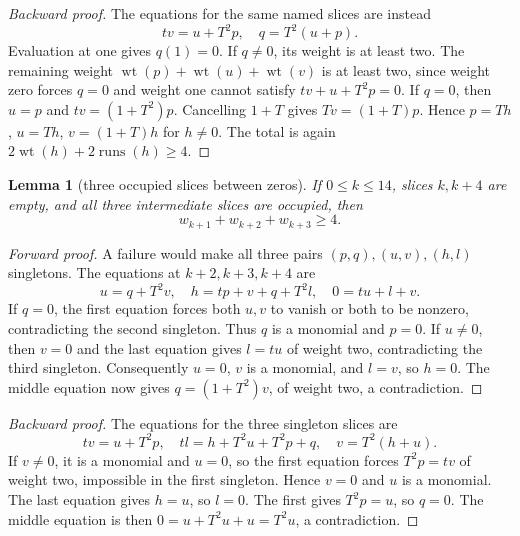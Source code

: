 \documentclass{article}
\newtheorem{lemma}{Lemma}
\DeclareMathOperator{\wt}{wt}
\DeclareMathOperator{\runs}{runs}
\begin{document}
\begin{proof}[Backward proof]
  The equations for the same named slices are instead
  \begin{equation}
    tv = u + T^2 p, \quad q = T^2 (u + p).
  \end{equation}
  Evaluation at one gives \(q(1) = 0\). If \(q \ne 0\), its weight is at least two.
  The remaining weight \(\wt(p) + \wt(u) + \wt(v)\) is at least two, since weight
  zero forces \(q = 0\) and weight one cannot satisfy \(tv + u + T^2 p = 0\).
  If \(q = 0\), then \(u = p\) and \(tv = (1 + T^2) p\). Cancelling \(1 + T\) gives
  \(Tv = (1 + T) p\). Hence \(p = Th\), \(u = Th\), \(v = (1 + T) h\) for \(h \ne 0\).
  The total is again \(2 \wt(h) + 2 \runs(h) \ge 4\).
\end{proof}

\begin{lemma}[three occupied slices between zeros]\label{lem:gap-four}
  If \(0 \le k \le 14\), slices
  \(k, k + 4\) are empty, and all three intermediate slices are occupied, then
  \begin{equation}
    w_{k+1} + w_{k+2} + w_{k+3} \ge 4.
  \end{equation}
\end{lemma}

\begin{proof}[Forward proof]  A failure would make all three pairs \((p,q), (u,v), (h,l)\)
  singletons. The equations at \(k + 2, k + 3, k + 4\) are
  \begin{equation}
    u = q + T^2 v, \quad h = tp + v + q + T^2 l, \quad 0 = tu + l + v.
  \end{equation}
  If \(q = 0\), the first equation forces both \(u, v\) to vanish or both to be
  nonzero, contradicting the second singleton. Thus \(q\) is a monomial and
  \(p = 0\). If \(u \ne 0\), then \(v = 0\) and the last equation gives \(l = tu\) of
  weight two, contradicting the third singleton. Consequently \(u = 0\), \(v\)
  is a monomial, and \(l = v\), so \(h = 0\). The middle equation now gives
  \(q = (1 + T^2) v\), of weight two, a contradiction.
\end{proof}

\begin{proof}[Backward proof]
  The equations for the three singleton slices are
  \begin{equation}
    tv = u + T^2 p, \quad tl = h + T^2 u + T^2 p + q, \quad v = T^2 (h + u).
  \end{equation}
  If \(v \ne 0\), it is a monomial and \(u = 0\), so the first equation forces
  \(T^2 p = tv\) of weight two, impossible in the first singleton. Hence \(v = 0\)
  and \(u\) is a monomial. The last equation gives \(h = u\), so \(l = 0\). The first
  gives \(T^2 p = u\), so \(q = 0\). The middle equation is then
  \(0 = u + T^2 u + u = T^2 u\), a contradiction.
\end{proof}
\end{document}
